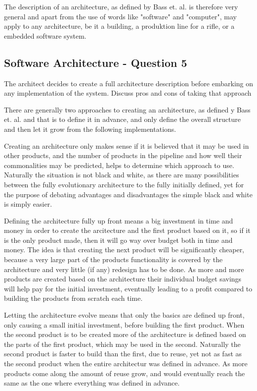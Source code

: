 The description of an architecture, as defined by Bass et. al. is therefore very general and apart from the use of words like "software" and "computer", may apply to any architecture, be it a building, a produktion line for a rifle, or a embedded software system.

\subsection{Software Architecture - Question 5}

\begin{question}
The architect decides to create a full architecture
description before embarking on any implementation of the
system. Discuss pros and cons of taking that approach
\end{question}

There are generally two approaches to creating an architecture, as defined y Bass et. al. and that is to define it in advance, and only define the overall structure and then let it grow from the following implementations. 

Creating an architecture only makes sense if it is believed that it may be used in other products, and the number of products in the pipeline and how well their commonalities may be predicted, helps to determine which approach to use. Naturally the situation is not black and white, as there are many possibilities between the fully evolutionary architecture to the fully initially defined, yet for the purpose of debating advantages and disadvantages the simple black and white is simply easier.

Defining the architecture fully up front means a big investment in time and money in order to create the arcitecture and the first product based on it, so if it is the only product made, then it will go way over budget both in time and money. The idea is that creating the next product will be significantly cheaper, because a very large part of the products functionality is covered by the architecture and very little (if any) redesign has to be done. As more and more products are created based on the architecture their individual budget savings will help pay for the initial investment, eventually leading to a profit compared to building the products from scratch each time.

Letting the architecture evolve means that only the basics are defined up front, only causing a small initial investment, before building the first product. When the second product is to be created more of the architecture is defined based on the parts of the first product, which may be used in the second. Naturally the second product is faster to build than the first, due to reuse, yet not as fast as the second product when the entire architectur was defined in advance. As more products come along the amount of reuse grow, and would eventually reach the same as the one where everything was defined in advance.

